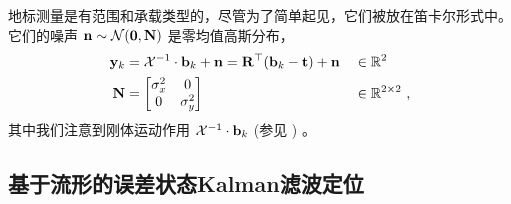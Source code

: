 %
地标测量是有范围和承载类型的，尽管为了简单起见，它们被放在笛卡尔形式中。
它们的噪声 ${\bf n}\sim\mathcal{N}({\bf0},{\bf N})$ 是零均值高斯分布，
%
\begin{align}\label{equ:meas_beacon}
{\bf y}_k &= \mathcal{X}^{-1}\cdot{\bf b}_k + {\bf n} = {\bf R}^{\top}({\bf b}_k-{\bf t}) + {\bf n}	&&\in {\mathbb R}^2
\\
{\bf N} &= \begin{bmatrix}
\sigma_x^2 &0 \\ 0& \sigma_y^2
\end{bmatrix}										&&\in{\mathbb R}^{2\times2}
~,
\end{align}
%
其中我们注意到刚体运动作用 $\mathcal{X}^{-1}\cdot{\bf b}_k$ (参见 ) 。




\subsection{基于流形的误差状态Kalman滤波定位}
\label{sec:loc_ESKF}

